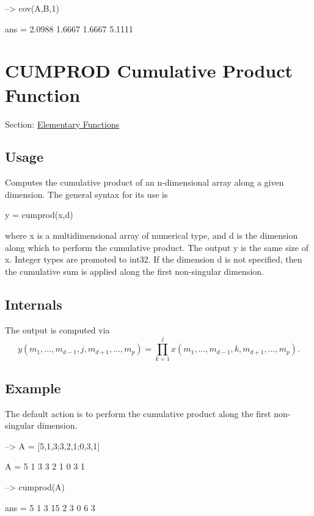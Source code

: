 \begin{DoxyVerbInclude}
--> cov(A,B,1)

ans = 
    2.0988    1.6667 
    1.6667    5.1111 
\end{DoxyVerbInclude}
 \hypertarget{elementary_cumprod}{}\section{C\-U\-M\-P\-R\-O\-D Cumulative Product Function}\label{elementary_cumprod}
Section\-: \hyperlink{sec_elementary}{Elementary Functions} \hypertarget{vtkwidgets_vtkxyplotwidget_Usage}{}\subsection{Usage}\label{vtkwidgets_vtkxyplotwidget_Usage}
Computes the cumulative product of an n-\/dimensional array along a given dimension. The general syntax for its use is \begin{DoxyVerb}  y = cumprod(x,d)
\end{DoxyVerb}
 where {\ttfamily x} is a multidimensional array of numerical type, and {\ttfamily d} is the dimension along which to perform the cumulative product. The output {\ttfamily y} is the same size of {\ttfamily x}. Integer types are promoted to {\ttfamily int32}. If the dimension {\ttfamily d} is not specified, then the cumulative sum is applied along the first non-\/singular dimension. \hypertarget{transforms_svd_Function}{}\subsection{Internals}\label{transforms_svd_Function}
The output is computed via \[ y(m_1,\ldots,m_{d-1},j,m_{d+1},\ldots,m_{p}) = \prod_{k=1}^{j} x(m_1,\ldots,m_{d-1},k,m_{d+1},\ldots,m_{p}). \] \hypertarget{variables_struct_Example}{}\subsection{Example}\label{variables_struct_Example}
The default action is to perform the cumulative product along the first non-\/singular dimension.


\begin{DoxyVerbInclude}
--> A = [5,1,3;3,2,1;0,3,1]

A = 
 5 1 3 
 3 2 1 
 0 3 1 

--> cumprod(A)

ans = 
  5  1  3 
 15  2  3 
  0  6  3 
\end{DoxyVerbInclude}


